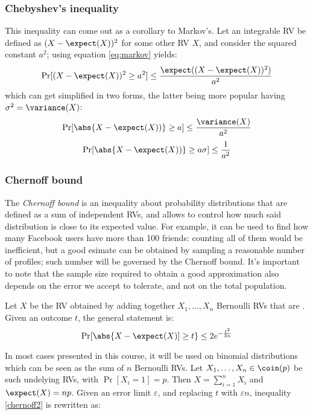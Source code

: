 \subsubsection{Chebyshev's inequality}

This inequality can come out as a corollary to Markov's. Let an integrable RV be defined as $(X - \expect(X))^2$ for some other RV $X$, and consider the squared constant $a^2$; using equation \ref{eq:markov} yields:
\[
    \Pr[(X - \expect(X))^2 \geq a^2] \leq \frac{\expect((X - \expect(X))^2)}{a^2}
\]
which can get simplified in two forms, the latter being more popular having $\sigma^2 = \variance(X)$:
\begin{equation}\label{eq:chebyshev2}
    \Pr[\abs{X - \expect(X))} \geq a] \leq \frac{\variance(X)}{a^2}
\end{equation}
\begin{equation}\label{eq:chebyshev}
    \Pr[\abs{X - \expect(X))} \geq a \sigma] \leq \frac{1}{a^2}
\end{equation}


\subsubsection{Chernoff bound}

The \emph{Chernoff bound} is an inequality about probability distributions that are defined as a sum of independent RVs, and allows to control how much said distribution is close to its expected value. For example, it can be used to find how many Facebook users have more than 100 friends: counting all of them would be inefficient, but a good esimate can be obtained by sampling a reasonable number of profiles; such number will be governed by the Chernoff bound. It's important to note that the sample size required to obtain a good approximation also depends on the error we accept to tolerate, and not on the total population.

\begin{defn}
    Let $X$ be the RV obtained by adding together $X_1, \dots, X_n$ Bernoulli RVs that are \iid. Given an outcome $t$, the general statement is:
    \begin{equation}\label{chernoff2}
        \Pr[\abs{X - \expect(X)] \geq t} \leq 2e^{-\frac{t^2}{3n}}
    \end{equation}
\end{defn}

In most cases presented in this course, it will be used on binomial distributions which can be seen as the sum of $n$ \iid{} Bernoulli RVs. Let $X_1, \dots, X_n \in \coin(p)$ be such undelying RVs, with $\Pr[X_i = 1] = p$. Then $X = \sum_{i = 1}^{n} X_i$ and $\expect(X) = np$. Given an error limit $\varepsilon$, and replacing $t$ with $\varepsilon n$, inequality \ref{chernoff2} is rewritten as:

